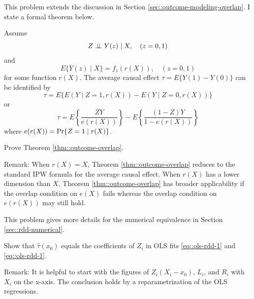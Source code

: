 \begin{HomeworkProblem}\label{exr:20-1}

This problem extends the discussion in Section \ref{sec::outcome-modeling-overlap}. I state a formal theorem below.

\begin{Theorem}
\label{thm::outcome-overlap}
Assume
\[
Z\mathrel{\perp\!\!\!\perp} Y(z) \mid X, \quad (z=0,1)
\]
and
\[
E\{  Y(z) \mid X \} = f_z( r(X)   ),\quad (z=0,1)
\]
for some function $r(X)$.
The average causal effect $\tau = E\{ Y(1) - Y(0)  \}$ can be identified by
\[
\tau =E\{   E(Y\mid Z=1, r(X)) - E(Y\mid Z=0, r(X)) \}
\]
or
\[
\tau = E\left\{   \frac{ZY}{  e(r(X)) }  \right\}  - E\left\{   \frac{(1-Z)Y}{ 1 -  e(r(X)) }  \right\}
\]
where $e(r(X)) = \operatorname{Pr}\{ Z=1\mid r(X) \}$.
\end{Theorem}

Prove Theorem \ref{thm::outcome-overlap}.

Remark: When $r(X) = X$, Theorem \ref{thm::outcome-overlap} reduces to the standard IPW formula for the average causal effect. When $r(X)$ has a lower dimension than $X$, Theorem \ref{thm::outcome-overlap} has broader applicability if the overlap condition on $e(X)$ fails whereas the overlap condition on $e(r(X)) $ may still hold.




\end{HomeworkProblem}

\begin{HomeworkProblem}\label{exr:20-2}


 This problem gives more details for the numerical equivalence in Section \ref{sec::rdd-numerical}.

 Show that $\hat\tau(x_0) $ equals the coefficients of $Z_i$ in OLS fits \eqref{eq::ols-rdd-1} and \eqref{eq::ols-rdd-1}.



Remark: It is helpful to start with the figures of $Z_i(X_i - x_0)$, $L_i$, and $R_i$ with $X_i$ on the x-axis. The conclusion holds by a reparametrization of the OLS regressions.



\end{HomeworkProblem}

